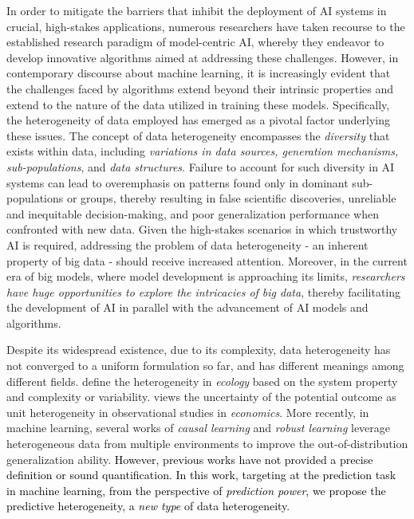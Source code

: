 In order to mitigate the barriers that inhibit the deployment of AI systems in crucial, high-stakes applications, numerous researchers have taken recourse to the established research paradigm of model-centric AI, whereby they endeavor to develop innovative algorithms aimed at addressing these challenges.
However, in contemporary discourse about machine learning, it is increasingly evident that the challenges faced by algorithms extend beyond their intrinsic properties and extend to the nature of the data utilized in training these models. 
Specifically, the heterogeneity of data employed has emerged as a pivotal factor underlying these issues.
The concept of data heterogeneity encompasses the \emph{diversity} that exists within data, including \emph{variations in data sources, generation mechanisms, sub-populations}, and \emph{data structures}. 
Failure to account for such diversity in AI systems can lead to overemphasis on patterns found only in dominant sub-populations or groups, thereby resulting in false scientific discoveries, unreliable and inequitable decision-making, and poor generalization performance when confronted with new data. 
Given the high-stakes scenarios in which trustworthy AI is required, addressing the problem of data heterogeneity - an inherent property of big data - should receive increased attention. 
Moreover, in the current era of big models, where model development is approaching its limits, \emph{researchers have huge opportunities to explore the intricacies of big data}, thereby facilitating the development of AI in parallel with the advancement of AI models and algorithms.



Despite its widespread existence, due to its complexity, data heterogeneity has not converged to a uniform formulation so far, and has different meanings among different fields.
\cite{li1995definition} define the heterogeneity in \emph{ecology} based on the system property and complexity or variability.
\cite{rosenbaum2005heterogeneity} views the uncertainty of the potential outcome as unit heterogeneity in observational studies in \emph{economics}.
More recently, in machine learning, several works of \emph{causal learning} \citep{peters2016causal, arjovsky2019invariant, koyama2020out, liu2021heterogeneous,creager2021environment} and \emph{robust learning} \citep{sagawa2019distributionally, liu2022distributionally} leverage heterogeneous data from multiple environments to improve the out-of-distribution generalization ability.
\textcolor{black}{However, previous works have not provided a precise definition or sound quantification.
In this work, targeting at the prediction task in machine learning, from the perspective of \emph{prediction power}, we propose the predictive heterogeneity, a \emph{new type} of data heterogeneity.}


